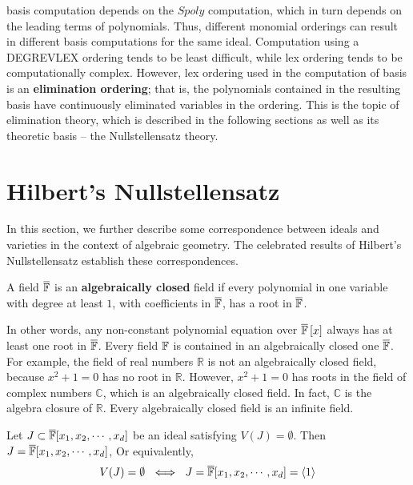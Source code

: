 \Grobner basis computation depends on the $Spoly$ computation, which in turn 
depends on the leading terms of polynomials. Thus, different monomial 
orderings can result in different \Grobner basis computations for the 
same ideal. Computation using a DEGREVLEX ordering tends to be least 
difficult, while lex ordering tends to be computationally complex. However, 
lex ordering used in the computation of \Grobner basis is an {\bf elimination
ordering}; that is, the polynomials contained in the resulting \Grobner basis
have continuously eliminated variables in the ordering. This is the topic of 
elimination theory, which is described in the following sections as well as 
its theoretic basis -- the Nullstellensatz theory.

\section{Hilbert's Nullstellensatz}

In this section, we further describe some correspondence between ideals and 
varieties in the context of algebraic geometry. The celebrated results of 
Hilbert's Nullstellensatz establish these correspondences.

\begin{Definition}\label{def:acf}
A field $\overline {{\mathbb{F}}}$ is an {\bf algebraically closed} field if every  
polynomial in one variable with degree at least $1$, with coefficients 
in $\overline {{\mathbb{F}}}$, has a root in $\overline {{\mathbb{F}}}$. 
\end{Definition}
In other words, any non-constant polynomial equation over 
$\overline {{\mathbb{F}}}\left[x\right]$ always has at least one root 
in $\overline {{\mathbb{F}}}$. Every field ${\mathbb{F}}$ is contained in an algebraically 
closed one $\overline {{\mathbb{F}}}$. 
For example, the field of real numbers $\mathbb{R}$ is not an algebraically closed 
field, because $x^2+1=0$ has no root in $\mathbb{R}$. 
However, $x^2+1=0$ has roots in the field of 
complex numbers $\mathbb{C}$, which is an algebraically closed field. 
In fact, $\mathbb{C}$ is the algebra closure of $\mathbb{R}$. 
Every algebraically closed field is an infinite field. 

\begin{Theorem}
Let $J \subset \overline {{\mathbb{F}}}[x_1, x_2, \cdots, x_d]$ 
be an ideal satisfying $V(J)=\emptyset$. 
Then $J=\overline {{\mathbb{F}}}[x_1, x_2, \cdots, x_d]$, Or equivalently, 
\begin{equation}
V(J)=\emptyset\ \iff\ J=\overline {{\mathbb{F}}}[x_1, x_2, \cdots, x_d]=\langle 1 \rangle 
\end{equation}
\end{Theorem}


